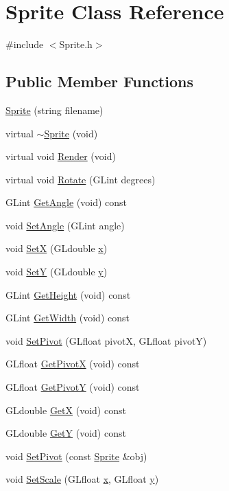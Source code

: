 \hypertarget{class_sprite}{
\section{Sprite Class Reference}
\label{class_sprite}
}


{\ttfamily \#include $<$Sprite.h$>$}

\subsection*{Public Member Functions}
\begin{DoxyCompactItemize}
\item 
\hyperlink{class_sprite_ac9efd3711ed9c2cf94a0f8bdd0fcf332}{Sprite} (string filename)
\item 
virtual \hyperlink{class_sprite_ae2cc659dea1ee5802b336d5c9b4f8f41}{$\sim$Sprite} (void)
\item 
virtual void \hyperlink{class_sprite_a0f9680e3bd7bf6bcd4c59620ba936347}{Render} (void)
\item 
virtual void \hyperlink{class_sprite_ad055732a0053d7d61e2a9a23cdec5b88}{Rotate} (GLint degrees)
\item 
GLint \hyperlink{class_sprite_ad8b341a7fa7c1839847d35cf1bef042f}{GetAngle} (void) const 
\item 
void \hyperlink{class_sprite_aad89d6d88e1dd4551cb75c4e852d7091}{SetAngle} (GLint angle)
\item 
void \hyperlink{class_sprite_a3e88970a65ba19aa9916886f5d7952c6}{SetX} (GLdouble \hyperlink{wglext_8h_ad77deca22f617d3f0e0eb786445689fc}{x})
\item 
void \hyperlink{class_sprite_a111f8054c1f27e59536be054ff0044ff}{SetY} (GLdouble \hyperlink{wglext_8h_a9298c7ad619074f5285b32c6b72bfdea}{y})
\item 
GLint \hyperlink{class_sprite_a7cfbc6e561e056c300a0aadeadefd5ac}{GetHeight} (void) const 
\item 
GLint \hyperlink{class_sprite_a3efc77ab951abaa3b0eed9298b7c165d}{GetWidth} (void) const 
\item 
void \hyperlink{class_sprite_a70d31712d0f598d26a68c268bd4390eb}{SetPivot} (GLfloat pivotX, GLfloat pivotY)
\item 
GLfloat \hyperlink{class_sprite_a5b3a7ec629671f2a0e55ec35906d4677}{GetPivotX} (void) const 
\item 
GLfloat \hyperlink{class_sprite_ae9c1b0ea9f702290518565a279849454}{GetPivotY} (void) const 
\item 
GLdouble \hyperlink{class_sprite_ab655c1d242cfc1c671af986f2a4f862a}{GetX} (void) const 
\item 
GLdouble \hyperlink{class_sprite_a4caef59883510b0759f9ebb9d30b256a}{GetY} (void) const 
\item 
void \hyperlink{class_sprite_aee58f3653a2874def9dfc11086ad109a}{SetPivot} (const \hyperlink{class_sprite}{Sprite} \&obj)
\item 
void \hyperlink{class_sprite_ae0db821f5ffe067ab771a419bcbdb971}{SetScale} (GLfloat \hyperlink{wglext_8h_ad77deca22f617d3f0e0eb786445689fc}{x}, GLfloat \hyperlink{wglext_8h_a9298c7ad619074f5285b32c6b72bfdea}{y})
\end{DoxyCompactItemize}
